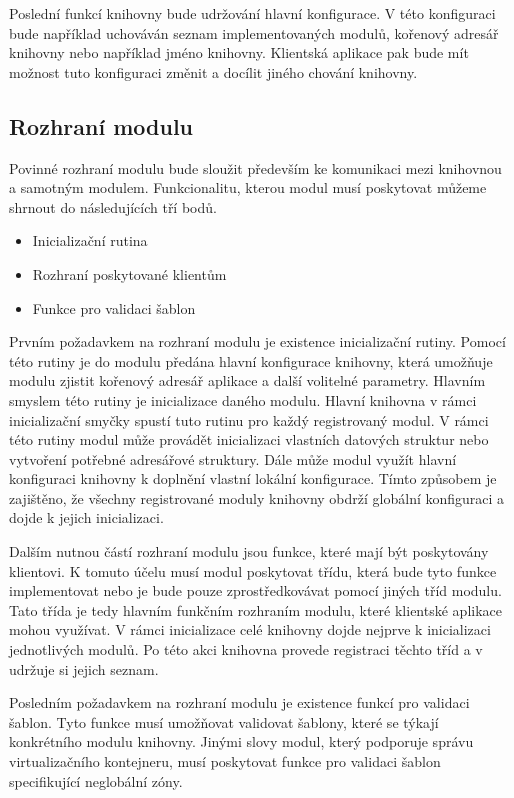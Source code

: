 Poslední funkcí knihovny bude udržování hlavní konfigurace. V této konfiguraci bude například uchováván seznam implementovaných
modulů, kořenový adresář knihovny nebo například jméno knihovny. Klientská aplikace pak bude mít možnost tuto konfiguraci
změnit a docílit jiného chování knihovny.
\subsection{Rozhraní modulu}
\label{chapter:implementation:library:interface}
Povinné rozhraní modulu bude sloužit především ke komunikaci mezi knihovnou a samotným modulem. Funkcionalitu, kterou modul
musí poskytovat můžeme shrnout do následujících tří bodů.
\begin{itemize}
 \item Inicializační rutina
 \item Rozhraní poskytované klientům
 \item Funkce pro validaci šablon
\end{itemize}

Prvním požadavkem na rozhraní modulu je existence inicializační rutiny. Pomocí této rutiny je do modulu předána hlavní
konfigurace knihovny, která umožňuje modulu zjistit kořenový adresář aplikace a další volitelné parametry. Hlavním smyslem
této rutiny je inicializace daného modulu. Hlavní knihovna v rámci inicializační smyčky spustí tuto rutinu pro každý
registrovaný modul. V rámci této rutiny modul může provádět inicializaci vlastních datových struktur nebo vytvoření potřebné
adresářové struktury. Dále může modul využít hlavní konfiguraci knihovny k doplnění vlastní lokální konfigurace. Tímto způsobem
je zajištěno, že všechny registrované moduly knihovny obdrží globální konfiguraci a dojde k jejich inicializaci.

Dalším nutnou částí rozhraní modulu jsou funkce, které mají být poskytovány klientovi. K tomuto účelu musí modul poskytovat
třídu, která bude tyto funkce implementovat nebo je bude pouze zprostředkovávat pomocí jiných tříd modulu. Tato třída je tedy
hlavním funkčním rozhraním modulu, které klientské aplikace mohou využívat. V rámci inicializace celé knihovny dojde nejprve
k inicializaci jednotlivých modulů. Po této akci knihovna provede registraci těchto tříd a v udržuje si jejich seznam.

Posledním požadavkem na rozhraní modulu je existence funkcí pro validaci šablon. Tyto funkce musí umožňovat validovat šablony,
které se týkají konkrétního modulu knihovny. Jinými slovy modul, který podporuje správu virtualizačního kontejneru, musí poskytovat
funkce pro validaci šablon specifikující neglobální zóny.

